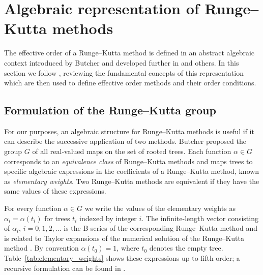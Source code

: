 \section{Algebraic representation of Runge--Kutta methods}\label{sec:Algebraic_RK}

The effective order of a Runge--Kutta method is defined in an abstract algebraic
context introduced by Butcher \cite{Butcher1969} and developed further in
\cite{Butcher1972, Hairer1974, Butcher1996, Butcher1998} and others.
In this section we follow \cite{Butcher2008_book}, reviewing the fundamental
concepts of this representation which are then used to define
effective order methods and their order conditions.


\subsection{Formulation of the Runge--Kutta group}\label{sec:RK_group}


For our purposes, an algebraic structure for Runge--Kutta methods is useful if it can describe
the successive application of two methods.
Butcher \cite{Butcher1972} proposed the group $G$ of all real-valued maps on the
set of rooted trees.
Each function $\alpha \in G$ corresponds
to an \emph{equivalence class} of Runge--Kutta methods and maps trees to specific
algebraic expressions in the coefficients
of a Runge--Kutta method, known as \emph{elementary weights}.
Two Runge--Kutta methods are equivalent if they have the same values of these expressions.


For every function $\alpha \in G$ we write the values of the
elementary weights as $\alpha_{i} = \alpha(t_{i})$ for trees $t_{i}$
indexed by integer $i$.
The infinite-length vector consisting of $\alpha_i$, $i = 0, 1, 2,\ldots$ is the B-series
of the corresponding Runge--Kutta method and is related to Taylor expansions of the numerical solution of the Runge--Kutta method \cite{Hairer1974, Butcher2008_book}. 
By convention $\alpha(t_{0}) = 1$, where $t_{0}$ denotes the empty tree. 
Table~\ref{tab:elementary_weights} shows these expressions up to fifth order; a recursive formulation can be found in \cite[Definition 312]{Butcher2008_book}. 

